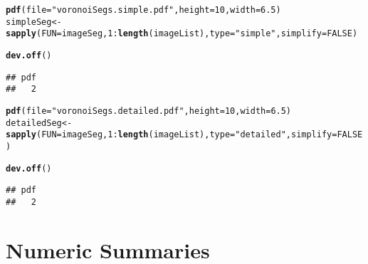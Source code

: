 \documentclass{article}\usepackage[]{graphicx}\usepackage[]{xcolor}
\makeatletter
\newcommand{\hlnum}[1]{\textcolor[rgb]{0.686,0.059,0.569}{#1}}%
\newcommand{\hlstr}[1]{\textcolor[rgb]{0.192,0.494,0.8}{#1}}%
\newcommand{\hlopt}[1]{\textcolor[rgb]{0,0,0}{#1}}%
\newcommand{\hlstd}[1]{\textcolor[rgb]{0.345,0.345,0.345}{#1}}%
\newcommand{\hlkwb}[1]{\textcolor[rgb]{0.69,0.353,0.396}{#1}}%
\newcommand{\hlkwc}[1]{\textcolor[rgb]{0.333,0.667,0.333}{#1}}%
\newcommand{\hlkwd}[1]{\textcolor[rgb]{0.737,0.353,0.396}{\textbf{#1}}}%
\newenvironment{kframe}{%
 \def\at@end@of@kframe{}%
 \ifinner\ifhmode%
  \def\at@end@of@kframe{\end{minipage}}%
  \begin{minipage}{\columnwidth}%
 \fi\fi%
 \def\FrameCommand##1{\hskip\@totalleftmargin \hskip-\fboxsep
 \colorbox{shadecolor}{##1}\hskip-\fboxsep
     \hskip-\linewidth \hskip-\@totalleftmargin \hskip\columnwidth}%
 \MakeFramed {\advance\hsize-\width
   \@totalleftmargin\z@ \linewidth\hsize
   \@setminipage}}%
 {\par\unskip\endMakeFramed%
 \at@end@of@kframe}
\newenvironment{knitrout}{}{} %
\makeatother
\begin{document}
\begin{knitrout}
\color{fgcolor}\begin{kframe}
\begin{alltt}
\hlkwd{pdf}\hlstd{(}\hlkwc{file}\hlstd{=}\hlstr{"voronoiSegs.simple.pdf"}\hlstd{,}\hlkwc{height}\hlstd{=}\hlnum{10}\hlstd{,}\hlkwc{width}\hlstd{=}\hlnum{6.5}\hlstd{)}
\hlstd{simpleSeg}\hlkwb{<-}\hlkwd{sapply}\hlstd{(}\hlkwc{FUN}\hlstd{=imageSeg,}\hlnum{1}\hlopt{:}\hlkwd{length}\hlstd{(imageList),}\hlkwc{type}\hlstd{=}\hlstr{"simple"}\hlstd{,}\hlkwc{simplify}\hlstd{=}\hlnum{FALSE}\hlstd{)}
\end{alltt}


{\ttfamily\noindent\bfseries\color{errorcolor}{\#\# Error in match.fun(FUN): object 'imageSeg' not found}}\begin{alltt}
\hlkwd{dev.off}\hlstd{()}
\end{alltt}
\begin{verbatim}
## pdf 
##   2
\end{verbatim}
\begin{alltt}
\hlkwd{pdf}\hlstd{(}\hlkwc{file}\hlstd{=}\hlstr{"voronoiSegs.detailed.pdf"}\hlstd{,}\hlkwc{height}\hlstd{=}\hlnum{10}\hlstd{,}\hlkwc{width}\hlstd{=}\hlnum{6.5}\hlstd{)}
\hlstd{detailedSeg}\hlkwb{<-}\hlkwd{sapply}\hlstd{(}\hlkwc{FUN}\hlstd{=imageSeg,}\hlnum{1}\hlopt{:}\hlkwd{length}\hlstd{(imageList),}\hlkwc{type}\hlstd{=}\hlstr{"detailed"}\hlstd{,}\hlkwc{simplify}\hlstd{=}\hlnum{FALSE}\hlstd{)}
\end{alltt}


{\ttfamily\noindent\bfseries\color{errorcolor}{\#\# Error in match.fun(FUN): object 'imageSeg' not found}}\begin{alltt}
\hlkwd{dev.off}\hlstd{()}
\end{alltt}
\begin{verbatim}
## pdf 
##   2
\end{verbatim}
\end{kframe}
\end{knitrout}

\section{Numeric Summaries}
\end{document}
